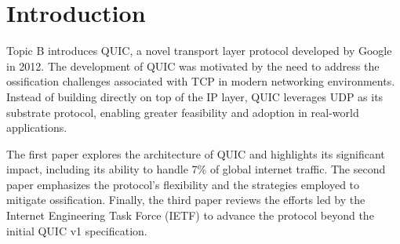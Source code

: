 \section{Introduction}%
\label{sec:Introduction}
Topic B introduces QUIC, a novel transport layer protocol developed by Google in 2012. The development of QUIC was motivated by the need to address the ossification challenges associated with TCP in modern networking environments. Instead of building directly on top of the IP layer, QUIC leverages UDP as its substrate protocol, enabling greater feasibility and adoption in real-world applications.

The first paper explores the architecture of QUIC and highlights its significant impact, including its ability to handle 7\% of global internet traffic. The second paper emphasizes the protocol's flexibility and the strategies employed to mitigate ossification. Finally, the third paper reviews the efforts led by the Internet Engineering Task Force (IETF) to advance the protocol beyond the initial QUIC v1 specification.

